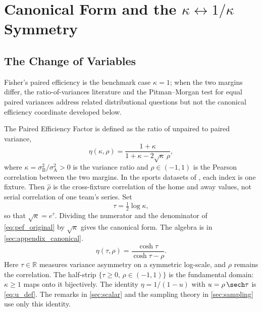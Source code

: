 \section{Canonical Form and the \texorpdfstring{$\kappa \leftrightarrow 1/\kappa$}{kappa <-> 1/kappa} Symmetry}
\label{sec:canonical}

\subsection{The Change of Variables}

Fisher's paired efficiency \parencite{fisher1935} is the benchmark case $\kappa = 1$; when the two margins differ, the ratio-of-variances literature \parencite{bose1935} and the Pitman--Morgan test for equal paired variances \parencite{pitman1939,morgan1939} address related distributional questions but not the canonical efficiency coordinate developed below.

The Paired Efficiency Factor \parencite{brownPEFempirical} is defined as the ratio of unpaired to paired variance,
\begin{equation}
  \eta(\kappa,\rho)
  = \frac{1+\kappa}{1+\kappa-2\sqrt{\kappa}\,\rho},
  \label{eq:pef_original}
\end{equation}
where $\kappa = \sigma_{\mathrm{B}}^{2}/\sigma_{\mathrm{A}}^{2} > 0$ is the variance ratio and $\rho \in (-1,1)$ is the Pearson correlation between the two margins.
In the sports datasets of \textcite{brownPEFempirical}, each index is one fixture.
Then $\hat\rho$ is the cross-fixture correlation of the home and away values, not serial correlation of one team's series.
Set
\begin{equation}
  \tau = \tfrac{1}{2}\log\kappa,
  \label{eq:tau_def}
\end{equation}
so that $\sqrt{\kappa} = e^{\tau}$.
Dividing the numerator and the denominator of \cref{eq:pef_original} by $\sqrt{\kappa}$ gives the canonical form.
The algebra is in \cref{sec:appendix_canonical}.
\begin{equation}
  \eta(\tau,\rho)
  = \frac{\cosh\tau}{\cosh\tau - \rho}.
  \label{eq:canonical}
\end{equation}
Here $\tau \in \mathbb{R}$ measures variance asymmetry on a symmetric log-scale, and $\rho$ remains the correlation.
The half-strip $\{\tau \ge 0,\, \rho \in (-1,1)\}$ is the fundamental domain: $\kappa \ge 1$ maps onto it bijectively.
The identity $\eta = 1/(1-u)$ with $u = \rho\,\sech\tau$ is \cref{eq:u_def}.
The remarks in \cref{sec:scalar} and the sampling theory in \cref{sec:sampling} use only this identity.

